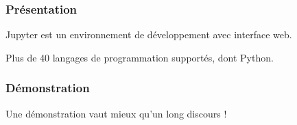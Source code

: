 \begin{frame}
  \frametitle{Présentation}
  Jupyter est un environnement de développement avec interface web.

  Plus de 40 langages de programmation supportés, dont Python.

\end{frame}

\begin{frame}
  \frametitle{Démonstration}
  Une démonstration vaut mieux qu'un long discours !

\end{frame}
